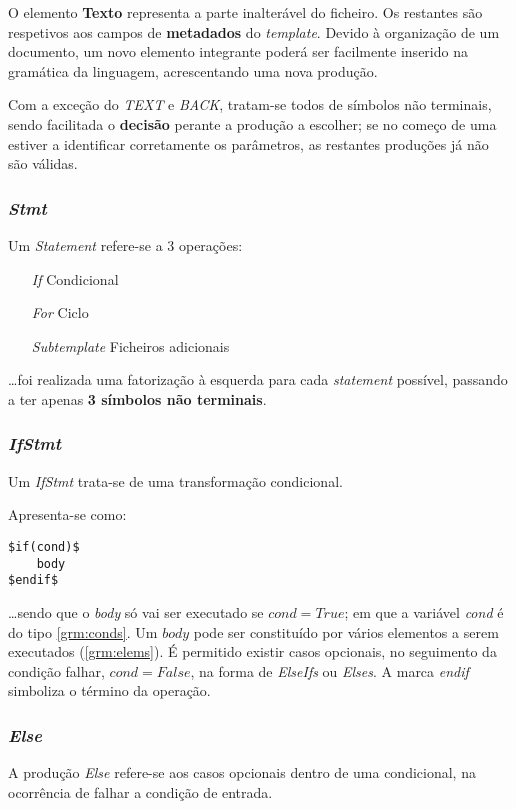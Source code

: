 \documentclass[../relatorio.tex]{subfiles}
\begin{document}
O elemento \textbf{Texto} representa a parte inalterável do 
ficheiro. 
Os restantes são respetivos aos campos de \textbf{metadados}
do \textit{template}.
Devido à organização de um documento, um novo elemento integrante 
poderá ser facilmente inserido
na gramática da linguagem, acrescentando uma nova produção.

Com a exceção do \textit{TEXT} e \textit{BACK},
tratam-se todos de símbolos não terminais, sendo facilitada
o \textbf{decisão} perante a produção a escolher; se no começo 
de uma estiver a identificar corretamente os parâmetros, 
as restantes produções já não são válidas.

\subsubsection{\textit{Stmt}}\label{grm:stmt}
Um \textit{Statement} refere-se a 3 operações:
\begin{enumerate}
    \item[\textit{If}]         {Condicional}
    \item[\textit{For}]        {Ciclo}
    \item[\textit{Subtemplate}]{Ficheiros adicionais}
\end{enumerate}
\dots foi realizada uma fatorização à esquerda para cada 
\textit{statement} possível, passando a ter apenas 
\textbf{3 símbolos não terminais}.

\subsubsection{\textit{IfStmt}} \label{grm:ifstmt}
Um \textit{IfStmt} trata-se de uma transformação
condicional.

Apresenta-se como:
\begin{verbatim}    
$if(cond)$
    body
$endif$
\end{verbatim}
\dots sendo que o \textit{body} só vai ser executado
se $cond=True$; em que a variável \textit{cond} é do 
tipo \ref{grm:conds}.
Um $body$ pode ser constituído por 
vários elementos a serem executados (\ref{grm:elems}).
É permitido existir casos opcionais, 
no seguimento da condição falhar, 
$cond=False$, na forma de \textit{ElseIfs} ou \textit{Elses}.
A marca \textit{endif} simboliza o término da operação.

\subsubsection{\textit{Else}} \label{grm:else}
A produção \textit{Else} refere-se aos casos opcionais 
dentro de uma condicional, na ocorrência de falhar a 
condição de entrada.
\end{document}

